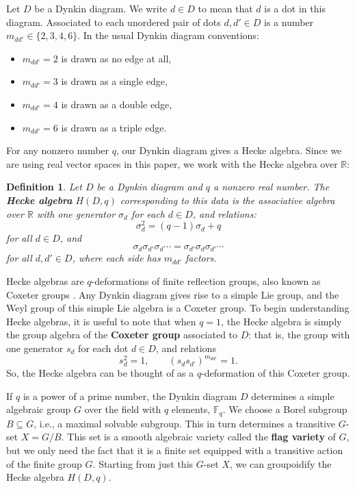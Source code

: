 \documentclass{article}
\newcommand{\R}{{\mathbb R}}
\newcommand{\F}{{\mathbb F}}
\newtheorem{definition}[thm]{Definition}
\begin{document}
Let $D$ be a Dynkin diagram.  We write $d \in D$ to mean that $d$ is a
dot in this diagram.  Associated to each unordered pair of dots $d,d'
\in D$ is a number $m_{dd'} \in \{2,3,4,6\}$.  In the usual Dynkin
diagram conventions:
\begin{itemize}
\item
$m_{dd'} = 2$ is drawn as no edge at all, 
\item
$m_{dd'} = 3$ is drawn as a single edge, 
\item 
$m_{dd'} = 4$ is drawn as a double edge, 
\item
$m_{dd'} = 6$ is drawn as a triple edge.  
\end{itemize}
For any nonzero number $q$, our Dynkin diagram gives a Hecke algebra.
Since we are using real vector spaces in this paper, we work with the
Hecke algebra over $\R$:
\begin{definition}
Let $D$ be a Dynkin diagram and $q$ a nonzero real number.  The
{\bf Hecke algebra} $H(D,q)$ corresponding to this data is the associative
algebra over $\R$ with one generator $\sigma_d$ for each $d \in D$,
and relations:
\[\sigma_d^2 = (q-1)\sigma_d + q \]
for all $d \in D$, and
\[\sigma_d\sigma_{d'}\sigma_d\cdots 
= \sigma_{d'} \sigma_d \sigma_{d'}\cdots \]
for all $d,d'\in D$, where each side has $m_{dd'}$ factors.
\end{definition}
\noindent

Hecke algebras are $q$-deformations of finite reflection groups, also
known as Coxeter groups \cite{Humphreys}.  Any Dynkin diagram gives
rise to a simple Lie group, and the Weyl group of this simple Lie
algebra is a Coxeter group. 
To begin understanding Hecke algebras, it is useful to note that
when $q = 1$, the Hecke algebra is simply the group algebra of
the {\bf Coxeter group} associated to $D$: that is, the group
with one generator $s_d$ for each dot $d \in D$, and relations
\[ s_d^2 = 1,  \qquad (s_d s_{d'})^{m_{dd'}} = 1 .\]
So, the Hecke algebra can be thought of as a $q$-deformation of this
Coxeter group.

If $q$ is a power of a prime number, the Dynkin diagram $D$ determines
a simple algebraic group $G$ over the field with $q$ elements, $\F_q$.
We choose a Borel subgroup $B \subseteq G$, i.e., a maximal solvable
subgroup.  This in turn determines a transitive $G$-set $X = G/B$.
This set is a smooth algebraic variety called the {\bf flag variety}
of $G$, but we only need the fact that it is a finite set equipped
with a transitive action of the finite group $G$.  Starting from just
this $G$-set $X$, we can groupoidify the Hecke algebra $H(D,q)$.
\end{document}
